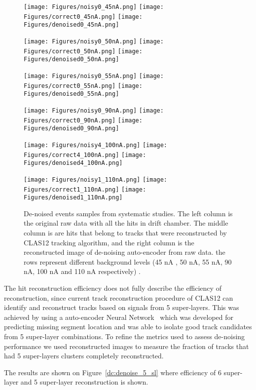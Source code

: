 \documentclass{article}
\begin{document}
\begin{figure}[!ht]
\begin{center}
\texttt{[image: Figures/noisy0\_45nA.png]}
\texttt{[image: Figures/correct0\_45nA.png]}
\texttt{[image: Figures/denoised0\_45nA.png]}

\texttt{[image: Figures/noisy0\_50nA.png]}
\texttt{[image: Figures/correct0\_50nA.png]}
\texttt{[image: Figures/denoised0\_50nA.png]}

\texttt{[image: Figures/noisy0\_55nA.png]}
\texttt{[image: Figures/correct0\_55nA.png]}
\texttt{[image: Figures/denoised0\_55nA.png]}

\texttt{[image: Figures/noisy0\_90nA.png]}
\texttt{[image: Figures/correct0\_90nA.png]}
\texttt{[image: Figures/denoised0\_90nA.png]}

\texttt{[image: Figures/noisy4\_100nA.png]}
\texttt{[image: Figures/correct4\_100nA.png]}
\texttt{[image: Figures/denoised4\_100nA.png]}

\texttt{[image: Figures/noisy1\_110nA.png]}
\texttt{[image: Figures/correct1\_110nA.png]}
\texttt{[image: Figures/denoised1\_110nA.png]}

 \caption {De-noised events samples from systematic studies. The left column is
 the original raw data with all the hits in drift chamber. The middle column is are
 hits that belong to tracks that were reconstructed by CLAS12 tracking algorithm,
 and the right column is the reconstructed image of de-noising auto-encoder from
 raw data. the rows represent different background levels
 (45 nA , 50 nA, 55 nA, 90 nA, 100 nA and 110 nA respectively) .}

 \label{dc:noise_study_samples}
 \end{center}
\end{figure}

The hit reconstruction efficiency does not fully describe the efficiency of reconstruction, since current
track reconstruction procedure of CLAS12 can identify and reconstruct tracks based on signals from
5 super-layers. This was achieved by using a auto-encoder Neural Network~\cite{Gavalian:2020xmc}
which was developed for predicting missing segment location and was able to isolate good track
candidates from 5 super-layer combinations. To refine the metrics used to assess de-noising performance
we used reconstructed images to measure the fraction of tracks that had 5 super-layers clusters
completely reconstructed.


The results are shown on Figure~\ref{dc:denoise_5_sl} where efficiency of 6 super-layer and 5 super-layer
reconstruction is shown.

\newpage


\end{document}
